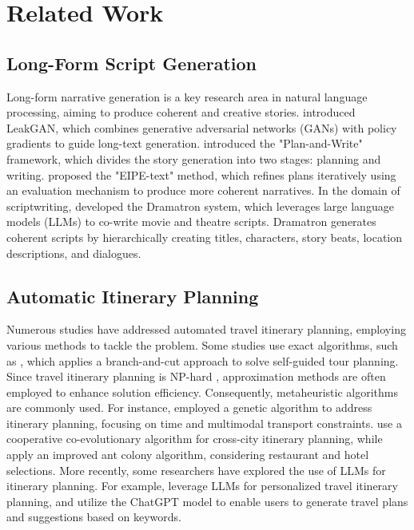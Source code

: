 \section{Related Work}
\subsection{Long-Form Script Generation}

Long-form narrative generation is a key research area in natural language processing, aiming to produce coherent and creative stories. \citet{guo2018long} introduced LeakGAN, which combines generative adversarial networks (GANs) with policy gradients to guide long-text generation. \citet{yao2019plan} introduced the "Plan-and-Write" framework, which divides the story generation into two stages: planning and writing. \citet{you2023eipe} proposed the "EIPE-text" method, which refines plans iteratively using an evaluation mechanism to produce more coherent narratives.  In the domain of scriptwriting, \citet{mirowski2023co} developed the Dramatron system, which leverages large language models (LLMs) to co-write movie and theatre scripts. Dramatron generates coherent scripts by hierarchically creating titles, characters, story beats, location descriptions, and dialogues.

\subsection{Automatic Itinerary Planning}

Numerous studies have addressed automated travel itinerary planning, employing various methods to tackle the problem. Some studies use exact algorithms, such as \citet{verbeeck2014extension}, which applies a branch-and-cut approach to solve self-guided tour planning. Since travel itinerary planning is NP-hard \cite{liao2018using, castro2015fast, gavalas2013cluster}, approximation methods are often employed to enhance solution efficiency. Consequently, metaheuristic algorithms are commonly used. For instance, \citet{abbaspour2009itinerary} employed a genetic algorithm to address itinerary planning, focusing on time and multimodal transport constraints. \citet{zhang2024cooperative} use a cooperative co-evolutionary algorithm for cross-city itinerary planning, while \citet{chen2023application} apply an improved ant colony algorithm, considering restaurant and hotel selections. More recently, some researchers have explored the use of LLMs for itinerary planning. For example, \citet{singh2024personal} leverage LLMs for personalized travel itinerary planning, and \citet{li2023everywheregpt} utilize the ChatGPT model to enable users to generate travel plans and suggestions based on keywords.